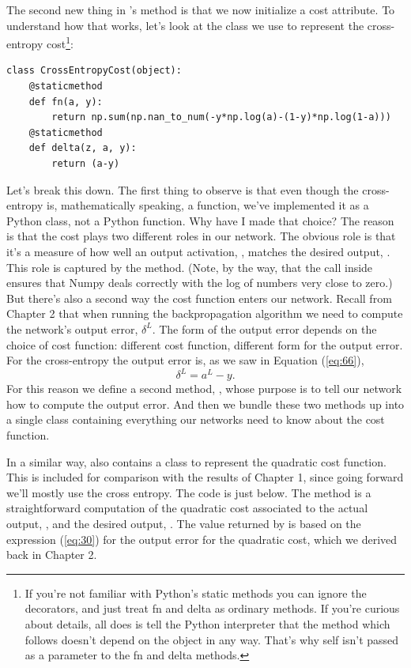 \documentclass[a4paper,twoside,10pt]{book}
\begin{document}
The second new thing in 's  method is that we now initialize a cost attribute. To understand how that works, let's look at the class we use to represent the cross-entropy cost\footnote{If you're not familiar with Python's static methods you can ignore the  decorators, and just treat fn and delta as ordinary methods. If you're curious about details, all  does is tell the Python interpreter that the method which follows doesn't depend on the object in any way. That's why self isn't passed as a parameter to the fn and delta methods.}:
\begin{lstlisting} 
class CrossEntropyCost(object):
	@staticmethod
	def fn(a, y):
		return np.sum(np.nan_to_num(-y*np.log(a)-(1-y)*np.log(1-a)))
	@staticmethod
	def delta(z, a, y):
		return (a-y)
\end{lstlisting}
Let's break this down. The first thing to observe is that even though the cross-entropy is, mathematically speaking, a function, we've implemented it as a Python class, not a Python function. Why have I made that choice? The reason is that the cost plays two different roles in our network. The obvious role is that it's a measure of how well an output activation, , matches the desired output, . This role is captured by the  method. (Note, by the way, that the  call inside  ensures that Numpy deals correctly with the log of numbers very close to zero.) But there's also a second way the cost function enters our network. Recall from Chapter 2 that when running the backpropagation algorithm we need to compute the network's output error, $\delta^L$. The form of the output error depends on the choice of cost function: different cost function, different form for the output error. For the cross-entropy the output error is, as we saw in Equation (\ref{eq:66}),
\begin{equation}
	\delta^L=a^L-y.\label{eq:99}
\end{equation}
For this reason we define a second method, , whose purpose is to tell our network how to compute the output error. And then we bundle these two methods up into a single class containing everything our networks need to know about the cost function.

In a similar way,  also contains a class to represent the quadratic cost function. This is included for comparison with the results of Chapter 1, since going forward we'll mostly use the cross entropy. The code is just below. The  method is a straightforward computation of the quadratic cost associated to the actual output, , and the desired output, . The value returned by  is based on the expression (\ref{eq:30}) for the output error for the quadratic cost, which we derived back in Chapter 2.
\end{document}

